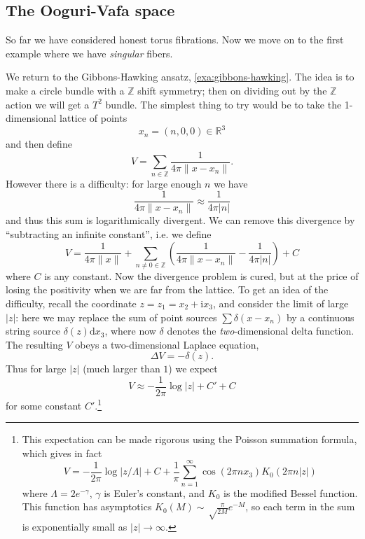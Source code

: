 \documentclass[12pt,letterpaper,reqno]{article}
\numberwithin{equation}{section}
\newcommand{\R}{\ensuremath{\mathbb R}}
\newcommand{\Z}{\ensuremath{\mathbb Z}}
\newcommand{\I}{{\mathrm i}}
\newcommand{\de}{\mathrm{d}}
\newcommand{\abs}[1]{\lvert#1\rvert}
\newcommand{\norm}[1]{\lVert#1\rVert}
\newcommand{\ti}[1]{\textit{#1}}
\begin{document}
\subsection{The Ooguri-Vafa space}

So far we have considered
honest torus fibrations. Now we move on to the first example 
where we have \ti{singular} fibers.

\begin{example} \cite{OV1996} 
We return to the Gibbons-Hawking
ansatz, \autoref{exa:gibbons-hawking}. The idea is to make a circle
bundle with a $\Z$ shift symmetry; then on dividing out by the $\Z$
action we will get a $T^2$ bundle. The simplest thing to try
would be to take the 1-dimensional lattice of points
\begin{equation}
  x_n = (n,0,0) \in \R^3
\end{equation}
and then define
\begin{equation}
  V = \sum_{n \in \Z} \frac{1}{4\pi\norm{x-x_n}}.
\end{equation}
However there is a difficulty: for large enough $n$
we have
\begin{equation}
  \frac{1}{4 \pi \norm{x-x_n}} \approx \frac{1}{4 \pi \abs{n}}
\end{equation}
and thus this sum is logarithmically divergent. We
can remove this divergence by ``subtracting an infinite constant'',
i.e. we define
\begin{equation} \label{eq:ooguri-vafa-V}
  V = \frac{1}{4 \pi \norm{x}} + \sum_{n \neq 0 \in \Z} \left( \frac{1}{4\pi\norm{x-x_n}} - \frac{1}{4\pi\abs{n}} \right) + C
\end{equation}
where $C$ is any constant.
Now the divergence problem is cured, but at the price of
losing the positivity when we are far from the lattice.
To get an idea of the difficulty, recall the 
coordinate $z = z_1 = x_2 + \I x_3$,
and consider the limit of large $\abs{z}$: here
we may replace the sum of point sources $\sum \delta(x-x_n)$
by a continuous string source $\delta(z) \de x_3$, where now
$\delta$ denotes the \ti{two}-dimensional delta function.
The resulting $V$ obeys a two-dimensional Laplace equation,
\begin{equation}
  \Delta V = -\delta(z).
\end{equation} 
Thus for large $\abs{z}$ (much larger than $1$) we expect
\begin{equation} \label{eq:ooguri-vafa-V-approx}
  V \approx -\frac{1}{2\pi} \log \abs{z} + C' + C
\end{equation}
for some constant $C'$.\footnote{This expectation can be made rigorous using the Poisson summation formula, which gives in fact
\begin{equation}
  V = -\frac{1}{2\pi} \log \abs{z/\Lambda} + C + \frac{1}{\pi} \sum_{n=1}^\infty \cos (2 \pi n x_3) K_0(2 \pi n \abs{z})
\end{equation}
where $\Lambda = 2 e^{-\gamma}$, $\gamma$ is Euler's constant,
and $K_0$ is the modified Bessel function. This function has asymptotics
$K_0(M) \sim \sqrt\frac{\pi}{2M} e^{-M}$, so each term in the 
sum is exponentially small as $\abs{z} \to \infty$.}


\end{example}
\end{document}
